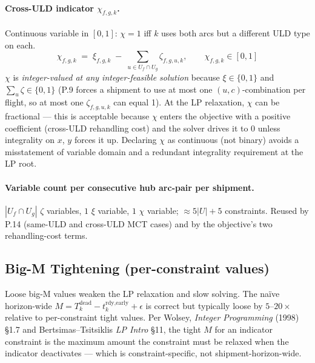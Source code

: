 \documentclass[11pt,a4paper]{article}
\theoremstyle{definition}
\begin{document}
\paragraph{Cross-ULD indicator $\chi_{f,g,k}$.}
Continuous variable in $[0, 1]$: $\chi = 1$ iff $k$ uses both arcs but a different
ULD type on each.
\begin{equation}
  \chi_{f,g,k} \;=\; \xi_{f,g,k} \;-\; \sum_{u \in U_f \cap U_g} \zeta_{f,g,u,k},
  \qquad \chi_{f,g,k} \in [0, 1]
\end{equation}
$\chi$ is \emph{integer-valued at any integer-feasible solution} because $\xi \in \{0,1\}$
and $\sum_u \zeta \in \{0, 1\}$ (P.9 forces a shipment to use at most one
$(u, c)$-combination per flight, so at most one $\zeta_{f,g,u,k}$ can equal 1).
At the LP relaxation, $\chi$ can be fractional --- this is acceptable because $\chi$
enters the objective with a positive coefficient (cross-ULD rehandling cost) and the
solver drives it to 0 unless integrality on $x$, $y$ forces it up. Declaring $\chi$
as continuous (not binary) avoids a misstatement of variable domain and a redundant
integrality requirement at the LP root.

\paragraph{Variable count per consecutive hub arc-pair per shipment.}
$|U_f \cap U_g|$ $\zeta$ variables, $1$ $\xi$ variable, $1$ $\chi$ variable;
$\approx 5|U|+5$ constraints. Reused by P.14 (same-ULD and cross-ULD MCT cases)
and by the objective's two rehandling-cost terms.

\subsection{Big-M Tightening (per-constraint values)}
\label{sec:bigm-tightening}

Loose big-M values weaken the LP relaxation and slow solving. The naïve horizon-wide
$M = T_k^{\text{dead}} - t_k^{\text{rdy,early}} + \epsilon$ is correct but typically
loose by $5\text{--}20\times$ relative to per-constraint tight values. Per Wolsey,
\emph{Integer Programming} (1998) \S1.7 and Bertsimas--Tsitsiklis \emph{LP Intro}
\S11, the tight $M$ for an indicator constraint is the maximum amount the constraint
must be relaxed when the indicator deactivates --- which is constraint-specific, not
shipment-horizon-wide.
\end{document}
